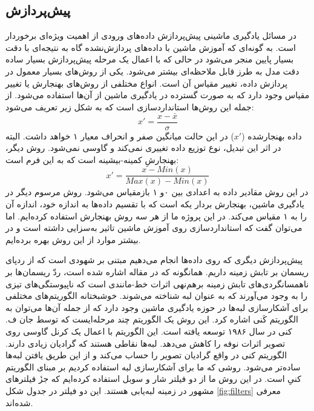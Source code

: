 \subsection{پیش‌پردازش}
\label{subsec:pre-proc}

در مسائل یادگیری ماشینی پیش‌پردازش داده‌های ورودی از اهمیت ویژه‌ای برخوردار است. به گونه‌ای که آموزش ماشین با داده‌های پردازش‌نشده گاه به نتیجه‌ای با دقت بسیار پایین منجر می‌شود در حالی که با اعمال یک مرحله پیش‌پردازش بسیار ساده دقت مدل به طرز قابل ملاحظه‌ای بیشتر می‌شود. یکی از روش‌های بسیار معمول در پردازش داده، تغییر مقیاس آن است.    انواع مختلفی از روش‌های بهنجارش یا تغییر مقیاس وجود دارد که به صورت گسترده در یادگیری ماشین از آن‌ها استفاده می‌شود. از جمله این روش‌ها استانداردسازی
است که به شکل زیر تعریف می‌شود: 
\begin{equation}
x' = \frac{x - \bar{x}}{\sigma}
\label{eq:z-score}
\end{equation}
داده بهنجارشده ($x'$) در این حالت میانگین صفر و انحراف معیار ۱ خواهد داشت. البته در اثر این تبدیل، نوع توزیع داده تغییری نمی‌کند و گاوسی نمی‌شود.
روش دیگر، بهنجارشِ کمینه-بیشینه    
است که به این فرم است:
\begin{equation}
x' = \frac{x - Min(x)}{Max(x) - Min(x)}
\end{equation} 
در این روش مقادیر داده به اعدادی بین ۰و ۱ بازمقیاس می‌شود.
روش مرسوم دیگر در یادگیری ماشین، بهنجارش بردار یکه
است که با تقسیم داده‌ها به اندازه خود، اندازه آن را به ۱ مقیاس می‌کند. 
\cite{shanker1996effect}
در این پروژه ما از هر سه روش بهنجارش استفاده کرده‌ایم. اما می‌توان گفت که استانداردسازی روی آموزش ماشین تاثیر به‌سزایی داشته است و در بیشتر موارد از این روش بهره برده‌ایم.
\par
پیش‌پردازش دیگری که روی داده‌ها انجام می‌دهیم مبتنی بر شهودی است که از ردپای ریسمان بر تابش زمینه داریم. همانگونه که در مقاله 
\cite{vafaei2017multiscale}
اشاره شده است، ردّ ریسمان‌ها بر ناهمسانگردی‌های تابش زمینه برهم‌نهی اثرات خط-مانندی است که ناپیوستگی‌های تیزی را به وجود می‌آورند که به عنوان لبه شناخته می‌شوند. خوشبختانه الگوریتم‌های مختلفی برای آشکارسازی لبه‌ها در حوزه یادگیری ماشین وجود دارد که از جمله آن‌ها می‌توان به الگوریتم کَنی
اشاره کرد.
\cite{canny1986computational}
این روش یک الگوریتم چند مرحله‌ایست که توسط جان ف. کنی در سال ۱۹۸۶ توسعه یافته است. این الگوریتم با اعمال یک کرنل گاوسی روی تصویر اثرات نوفه را کاهش می‌دهد. لبه‌ها نقاطی هستند که گرادیان زیادی دارند. الگوریتم کنی در واقع گرادیان تصویر را حساب می‌کند و از این طریق یافتن لبه‌ها ساده‌تر می‌شود. روشی که ما برای آشکارسازی لبه استفاده کردیم بر مبنای الگوریتم کنیِ است. در این روش ما از دو فیلتر شار
و سوبل
استفاده کرده‌ایم
\cite{jain1995machine}\cite{jahne1999handbook} 
که جزٔ فیلترهای مشهور در زمینه لبه‌یابی هستند. این دو فیلتر در جدول شکل
\ref{fig:filters}
معرفی شده‌اند.



